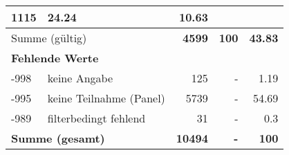 \begin{longtable}{lXrrr}
       \num{1115} &
       \num[round-mode=places,round-precision=2]{24,24} &
         \num[round-mode=places,round-precision=2]{10,63} \\
     \midrule
     \multicolumn{2}{l}{Summe (gültig)} &
       \textbf{\num{4599}} &
     \textbf{100} &
       \textbf{\num[round-mode=places,round-precision=2]{43,83}} \\
     \multicolumn{5}{l}{\textbf{Fehlende Werte}}\\
       -998 &
       keine Angabe &
         \num{125} &
        - &
         \num[round-mode=places,round-precision=2]{1,19} \\
       -995 &
       keine Teilnahme (Panel) &
         \num{5739} &
        - &
         \num[round-mode=places,round-precision=2]{54,69} \\
       -989 &
       filterbedingt fehlend &
         \num{31} &
        - &
         \num[round-mode=places,round-precision=2]{0,3} \\
     \midrule
     \multicolumn{2}{l}{\textbf{Summe (gesamt)}} &
          \textbf{\num{10494}} &
        \textbf{-} &
        \textbf{100} \\
     \bottomrule
     \end{longtable}
     
